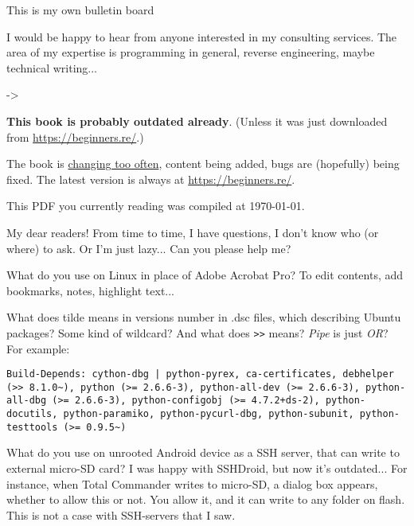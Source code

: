
\begin{center}
\LARGE{} This is my own bulletin board \normalsize{}
\end{center}

I would be happy to hear from anyone interested in my consulting services.
The area of my expertise is programming in general, reverse engineering, maybe technical writing...

-> \EMAIL{}

\myhrule{}

\textbf{This book is probably outdated already}.
(Unless it was just downloaded from \url{https://beginners.re/}.)

The book is \href{https://github.com/DennisYurichev/RE-for-beginners/commits/master}{changing too often},
content being added, bugs are (hopefully) being fixed.
The latest version is always at \url{https://beginners.re/}.

This PDF you currently reading was compiled at \today{}.

\myhrule{}

My dear readers! From time to time, I have questions, I don't know who (or where) to ask.
Or I'm just lazy...
Can you please help me?

\myhrule{}

What do you use on Linux in place of Adobe Acrobat Pro?
To edit contents, add bookmarks, notes, highlight text...

\myhrule{}

What does tilde means in versions number in .dsc files, which describing Ubuntu packages?
Some kind of wildcard?
And what does \verb|>>| means?
\emph{Pipe} is just \emph{OR}?
For example:

\begin{lstlisting}
Build-Depends: cython-dbg | python-pyrex, ca-certificates, debhelper (>> 8.1.0~), python (>= 2.6.6-3), python-all-dev (>= 2.6.6-3), python-all-dbg (>= 2.6.6-3), python-configobj (>= 4.7.2+ds-2), python-docutils, python-paramiko, python-pycurl-dbg, python-subunit, python-testtools (>= 0.9.5~)
\end{lstlisting}

\myhrule{}

What do you use on unrooted Android device as a SSH server, that can write to external micro-SD card?
I was happy with SSHDroid, but now it's outdated...
For instance, when Total Commander writes to micro-SD, a dialog box appears, whether to allow this or not.
You allow it, and it can write to any folder on flash.
This is not a case with SSH-servers that I saw.


